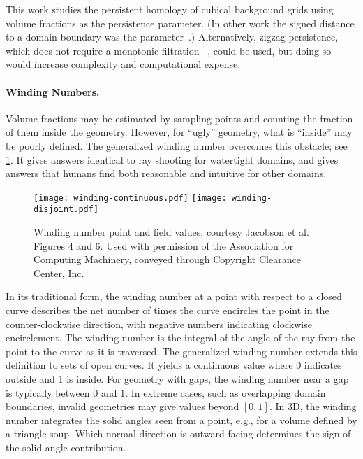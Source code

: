 This work studies the persistent homology of cubical background grids using volume fractions as the persistence parameter.
(In other work the signed distance to a domain boundary was the parameter~\cite{moon2019statistical}.) 
Alternatively, zigzag persistence, which does not require a monotonic filtration 
~\cite{carlsson2010zigzag,dey2024computing}, could be used, but doing so would increase complexity and computational expense.

\paragraph{Winding Numbers.}
Volume fractions may be estimated by sampling points and  counting the fraction of them inside the geometry. 
However, for ``ugly'' geometry, what is ``inside'' may be poorly defined.
The generalized winding number \cite{barill2018fast,Jacobson:2013} overcomes this obstacle; see \cref{fig:jacobson_winding}.
It gives answers identical to ray shooting for watertight domains, and gives answers that humans find both reasonable and intuitive for other domains.
\begin{figure}[!b]
\centering
\texttt{[image: winding-continuous.pdf]}
\texttt{[image: winding-disjoint.pdf]}
\caption{Winding number point and field values, courtesy Jacobson et al.~\cite{Jacobson:2013} Figures 4 and 6. Used with permission of the Association for Computing Machinery, conveyed through Copyright Clearance Center, Inc.}\label{fig:jacobson_winding}
\end{figure}
In its traditional form, the winding number at a point with respect to a closed curve describes the net number of times the curve encircles the point in the counter-clockwise direction, with negative numbers indicating clockwise encirclement.
The winding number is the integral of the angle of the ray from the point to the curve as it is traversed. 
The generalized winding number extends this definition to sets of open curves.
It yields a continuous value where 0 indicates outside and 1 is inside.
For geometry with gaps, the winding number near a gap is typically between 0 and 1. 
In extreme cases, such as overlapping domain boundaries, invalid geometries may give values beyond $[0,1]$.
In 3D, the winding number integrates the solid angles seen from a point, e.g., for a volume defined by a triangle soup. 
Which normal direction is outward-facing determines the sign of the solid-angle contribution.

